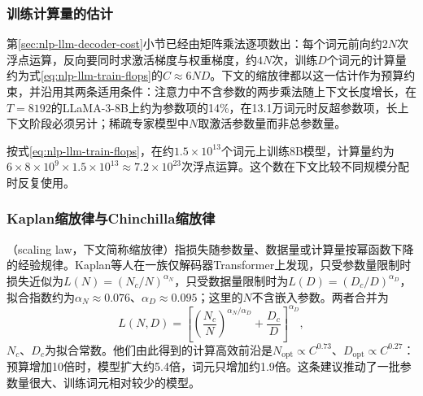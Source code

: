 \subsubsection{训练计算量的估计}
\label{sec:nlp-llm-compute-estimate}

第\ref{sec:nlp-llm-decoder-cost}小节已经由矩阵乘法逐项数出：每个词元前向约$2N$次浮点运算，反向要同时求激活梯度与权重梯度，约$4N$次，训练$D$个词元的计算量约为式\eqref{eq:nlp-llm-train-flops}的$C\approx6ND$。下文的缩放律都以这一估计作为预算约束，并沿用其两条适用条件：注意力中不含参数的两步乘法随上下文长度增长，在$T=8192$的LLaMA-3-8B上约为参数项的14\%，在13.1万词元时反超参数项，长上下文阶段必须另计；稀疏专家模型中$N$取激活参数量而非总参数量。

按式\eqref{eq:nlp-llm-train-flops}，在约$1.5\times10^{13}$个词元上训练8B模型，计算量约为$6\times8\times10^{9}\times1.5\times10^{13}\approx7.2\times10^{23}$次浮点运算。这个数在下文比较不同规模分配时反复使用。

\subsubsection{Kaplan缩放律与Chinchilla缩放律}
\label{sec:nlp-llm-scaling-laws}

（scaling law，下文简称缩放律）指损失随参数量、数据量或计算量按幂函数下降的经验规律。Kaplan等人在一族仅解码器Transformer上发现，只受参数量限制时损失近似为$L(N)=(N_c/N)^{\alpha_N}$，只受数据量限制时为$L(D)=(D_c/D)^{\alpha_D}$，拟合指数约为$\alpha_N\approx0.076$、$\alpha_D\approx0.095$；这里的$N$不含嵌入参数。两者合并为
\begin{equation}
 L(N,D)=\left[\left(\frac{N_c}{N}\right)^{\alpha_N/\alpha_D}+\frac{D_c}{D}\right]^{\alpha_D},
 \label{eq:nlp-llm-kaplan}
\end{equation}
$N_c$、$D_c$为拟合常数。他们由此得到的计算高效前沿是$N_{\mathrm{opt}}\propto C^{0.73}$、$D_{\mathrm{opt}}\propto C^{0.27}$：预算增加10倍时，模型扩大约5.4倍，词元只增加约1.9倍。这条建议推动了一批参数量很大、训练词元相对较少的模型。

